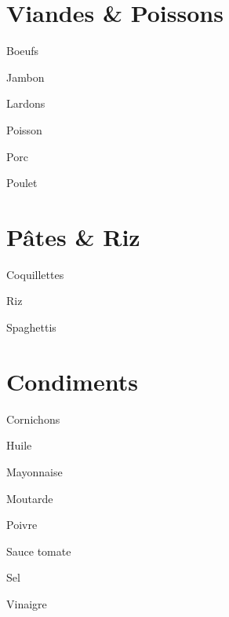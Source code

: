 \documentclass[8pt,landscape,a4paper]{article}
\begin{document}
\begin{multicols*}{4}
    \section{Viandes \& Poissons}
    \begin{todolist}
    \item Boeufs
    \item Jambon
    \item Lardons
    \item Poisson
    \item Porc
    \item Poulet
    \item 
    \item 
    \item 
    \item 
    \item 
    \item 
    \end{todolist}

    \section{Pâtes \& Riz}
    \begin{todolist}
    \item Coquillettes
    \item Riz
    \item Spaghettis
    \item 
    \item 
    \item 
    \end{todolist}

    \section{Condiments}
    \begin{todolist}
    \item Cornichons 
    \item Huile
    \item Mayonnaise
    \item Moutarde
    \item Poivre
    \item Sauce tomate
    \item Sel
    \item Vinaigre
    \item 
    \item 
    \item 
    \item 
    \item 
    \item 
    \end{todolist}


\end{multicols*}
\end{document}
